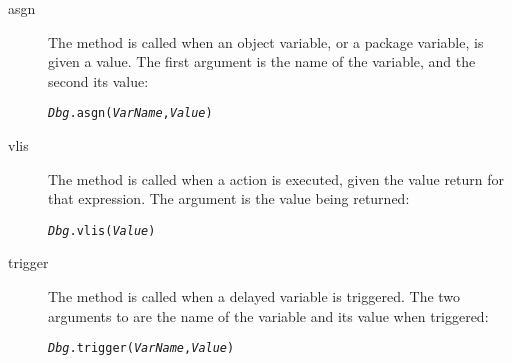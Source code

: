 \begin{description}
\item[asgn]
The  method is called when an object variable, or a package variable, is given a value. The first argument is the name of the variable, and the second its value:
\begin{alltt}
\emph{Dbg}.asgn(\emph{VarName},\emph{Value})
\end{alltt}


\item[vlis]
The  method is called when a  action is executed, given the value return for that  expression. The argument is the value being returned:
\begin{alltt}
\emph{Dbg}.vlis(\emph{Value})
\end{alltt}

\item[trigger]
The  method is called when a delayed variable is triggered. The two arguments to  are the name of the variable and its value when triggered:
\begin{alltt}
\emph{Dbg}.trigger(\emph{VarName},\emph{Value})
\end{alltt}

\end{description}



